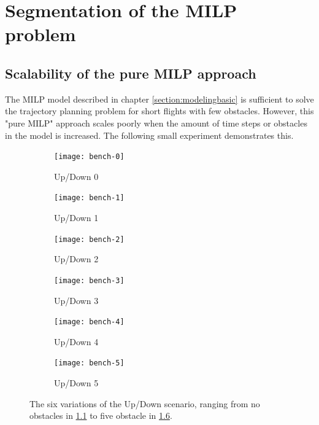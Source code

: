 \chapter{Segmentation of the MILP problem}
\label{section:segment}

\section{Scalability of the pure MILP approach}
The MILP model described in chapter \ref{section:modelingbasic} is sufficient to solve the trajectory planning problem for short flights with few obstacles. However, this "pure MILP" approach scales poorly when the amount of time steps or obstacles in the model is increased. The following small experiment demonstrates this.
\par
\begin{figure}[b]
	\centering
	\begin{subfigure}[t]{0.3\columnwidth}
        		\texttt{[image: bench-0]}
        		\caption{Up/Down 0}
        		 \label{fig:bench-0}
	\end{subfigure}	
	\hfill
	\begin{subfigure}[t]{0.3\columnwidth}
        		\texttt{[image: bench-1]}
        		\caption{Up/Down 1}
        		 \label{fig:bench-1}
	\end{subfigure}	
	\hfill
	\begin{subfigure}[t]{0.3\columnwidth}
        		\texttt{[image: bench-2]}
        		\caption{Up/Down 2}
        		 \label{fig:bench-2}
	\end{subfigure}
	\begin{subfigure}[t]{0.3\columnwidth}
        		\texttt{[image: bench-3]}
        		\caption{Up/Down 3}
        		 \label{fig:bench-3}
	\end{subfigure}	
	\hfill
	\begin{subfigure}[t]{0.3\columnwidth}
        		\texttt{[image: bench-4]}
        		\caption{Up/Down 4}
        		 \label{fig:bench-4}
	\end{subfigure}	
	\hfill
	\begin{subfigure}[t]{0.32\columnwidth}
        		\texttt{[image: bench-5]}
        		\caption{Up/Down 5}
        		 \label{fig:bench-5}
	\end{subfigure}		
	
			
	\caption[The six variations of the Up/Down scenario]{The six variations of the Up/Down scenario, ranging from no obstacles in \ref{fig:bench-0} to five obstacle in \ref{fig:bench-5}.}
    \label{fig:bench-pure}     
\end{figure}
